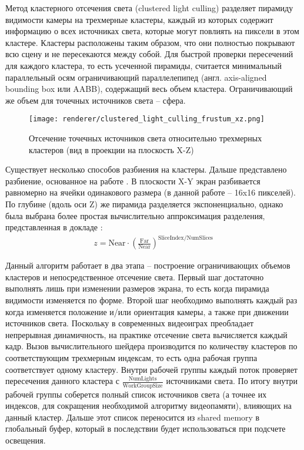 Метод кластерного отсечения света (clustered light culling) разделяет пирамиду видимости камеры на трехмерные кластеры, каждый из которых содержит информацию о всех источниках света, которые могут повлиять на пиксели в этом кластере. Кластеры расположены таким образом, что они полностью покрывают всю сцену и не пересекаются между собой. Для быстрой проверки пересечений для каждого кластера, то есть усеченной пирамиды, считается минимальный параллельный осям ограничивающий параллелепипед (англ. axis-aligned bounding box или AABB), содержащий весь объем кластера. Ограничивающий же объем для точечных источников света -- сфера.

\begin{figure}[h]
    \centering
    \texttt{[image: renderer/clustered\_light\_culling\_frustum\_xz.png]}
    \caption{Отсечение точечных источников света относительно трехмерных кластеров (вид в проекции на плоскость X-Z)}
    \label{fig:clustered_light_culling_frustum_xz}
\end{figure}

Существует несколько способов разбиения на кластеры. Дальше представлено разбиение, основанное на работе \cite{original_clustered_light_culling}. В плоскости X-Y экран разбивается равномерно на ячейки одинакового размера (в данной работе -- 16x16 пикселей). По глубине (вдоль оси Z) же пирамида разделяется экспоненциально, однако была выбрана более простая вычислительно аппроксимация разделения, представленная в докладе \cite{doom_clustered_z_splitting}:
\begin{align}
    z = \text{Near} \cdot \left( \frac{\text{Far}}{\text{Near}} \right) ^ {\text{SliceIndex} / \text{NumSlices}}
\end{align}

Данный алгоритм работает в два этапа -- построение ограничивающих объемов кластеров и непосредственное отсечение света. Первый шаг достаточно выполнять лишь при изменении размеров экрана, то есть когда пирамида видимости изменяется по форме. Второй шаг необходимо выполнять каждый раз когда изменяется положение и/или ориентация камеры, а также при движении источников света. Поскольку в современных видеоиграх преобладает непрерывная динамичность, на практике отсечение света вычисляется каждый кадр. Вызов вычислительного шейдера производится по количеству кластеров по соответствующим трехмерным индексам, то есть одна рабочая группа соответствует одному кластеру. Внутри рабочей группы каждый поток проверяет пересечения данного кластера с $\frac{\text{NumLights}}{\text{WorkGroupSize}}$ источниками света. По итогу внутри рабочей группы соберется полный список источников света (а точнее их индексов, для сокращения необходимой алгоритму видеопамяти), влияющих на данный кластер. Дальше этот список переносится из shared memory в глобальный буфер, который в последствии будет использоваться при подсчете освещения.


